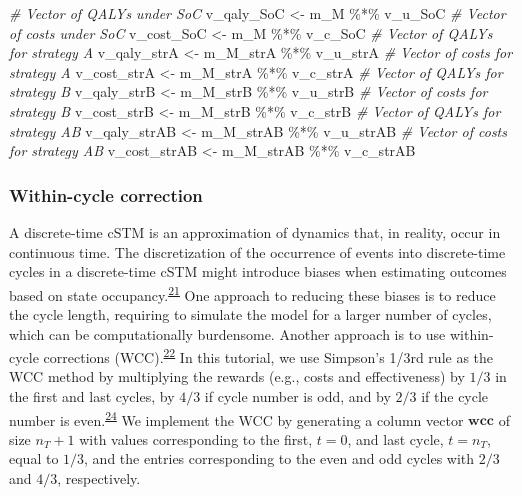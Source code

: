 \documentclass[
]{article}
\newenvironment{Shaded}{\begin{snugshade}}{\end{snugshade}}
\newcommand{\CommentTok}[1]{\textcolor[rgb]{0.56,0.35,0.01}{\textit{#1}}}
\newcommand{\NormalTok}[1]{#1}
\newcommand{\OtherTok}[1]{\textcolor[rgb]{0.56,0.35,0.01}{#1}}
\newcommand{\SpecialCharTok}[1]{\textcolor[rgb]{0.00,0.00,0.00}{#1}}
\begin{document}
\begin{Shaded}
\begin{Highlighting}[]
\CommentTok{\# Vector of QALYs under SoC}
\NormalTok{v\_qaly\_SoC }\OtherTok{\textless{}{-}}\NormalTok{ m\_M }\SpecialCharTok{\%*\%}\NormalTok{ v\_u\_SoC}
\CommentTok{\# Vector of costs under SoC}
\NormalTok{v\_cost\_SoC }\OtherTok{\textless{}{-}}\NormalTok{ m\_M }\SpecialCharTok{\%*\%}\NormalTok{ v\_c\_SoC}
\CommentTok{\# Vector of QALYs for strategy A}
\NormalTok{v\_qaly\_strA }\OtherTok{\textless{}{-}}\NormalTok{ m\_M\_strA }\SpecialCharTok{\%*\%}\NormalTok{ v\_u\_strA}
\CommentTok{\# Vector of costs for strategy A}
\NormalTok{v\_cost\_strA }\OtherTok{\textless{}{-}}\NormalTok{ m\_M\_strA }\SpecialCharTok{\%*\%}\NormalTok{ v\_c\_strA}
\CommentTok{\# Vector of QALYs for strategy B}
\NormalTok{v\_qaly\_strB }\OtherTok{\textless{}{-}}\NormalTok{ m\_M\_strB }\SpecialCharTok{\%*\%}\NormalTok{ v\_u\_strB}
\CommentTok{\# Vector of costs for strategy B}
\NormalTok{v\_cost\_strB }\OtherTok{\textless{}{-}}\NormalTok{ m\_M\_strB }\SpecialCharTok{\%*\%}\NormalTok{ v\_c\_strB}
\CommentTok{\# Vector of QALYs for strategy AB}
\NormalTok{v\_qaly\_strAB }\OtherTok{\textless{}{-}}\NormalTok{ m\_M\_strAB }\SpecialCharTok{\%*\%}\NormalTok{ v\_u\_strAB}
\CommentTok{\# Vector of costs for strategy AB}
\NormalTok{v\_cost\_strAB }\OtherTok{\textless{}{-}}\NormalTok{ m\_M\_strAB }\SpecialCharTok{\%*\%}\NormalTok{ v\_c\_strAB}
\end{Highlighting}
\end{Shaded}

\hypertarget{within-cycle-correction}{%
\subsubsection{Within-cycle correction}\label{within-cycle-correction}}

A discrete-time cSTM is an approximation of dynamics that, in reality, occur in continuous time. The discretization of the occurrence of events into discrete-time cycles in a discrete-time cSTM might introduce biases when estimating outcomes based on state occupancy.\textsuperscript{\protect\hyperlink{ref-VanRosmalen2013}{21}} One approach to reducing these biases is to reduce the cycle length, requiring to simulate the model for a larger number of cycles, which can be computationally burdensome. Another approach is to use within-cycle corrections (WCC).\textsuperscript{\protect\hyperlink{ref-Hunink2014}{22}} In this tutorial, we use Simpson's 1/3rd rule as the WCC method by multiplying the rewards (e.g., costs and effectiveness) by \(1/3\) in the first and last cycles, by \(4/3\) if cycle number is odd, and by \(2/3\) if the cycle number is even.\textsuperscript{\protect\hyperlink{ref-Elbasha2016a}{24}} We implement the WCC by generating a column vector \(\mathbf{wcc}\) of size \(n_T+1\) with values corresponding to the first, \(t=0\), and last cycle, \(t= n_T\), equal to \(1/3\), and the entries corresponding to the even and odd cycles with \(2/3\) and \(4/3\), respectively.
\end{document}

